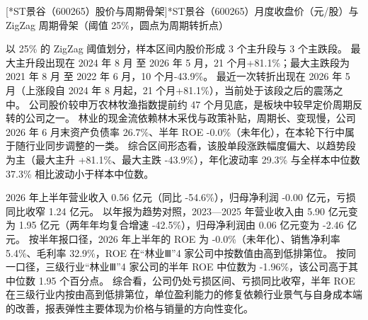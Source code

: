 \begin{center}
\begin{minipage}{\textwidth}\centering
{}

[*ST景谷（600265）股价与周期骨架]{*ST景谷（600265）月度收盘价（元/股）与 ZigZag 周期骨架（阈值 25\%，圆点为周期转折点）}
\end{minipage}
\end{center}

 以 25\% 的 ZigZag 阈值划分，样本区间内股价形成 3 个主升段与 3 个主跌段。 最大主升段出现在 2024 年 8 月 至 2026 年 5 月，21 个月+81.1\%；最大主跌段为 2021 年 8 月 至 2022 年 6 月，10 个月-43.9\%。 最近一次转折出现在 2026 年 5 月（上涨段自 2024 年 8 月起，21 个月+81.1\%），当前处于该段之后的震荡之中。 公司股价较申万农林牧渔指数提前约 47 个月见底，是板块中较早定价周期反转的公司之一。 林业的现金流依赖林木采伐与政策补贴，周期长、变现慢，公司 2026 年 6 月末资产负债率 26.7\%、半年 ROE -0.0\%（未年化），在本轮下行中属于随行业同步调整的一类。 综合区间形态看，该股单段涨跌幅度偏大、以趋势段为主（最大主升 +81.1\%、最大主跌 -43.9\%），年化波动率 29.3\% 与全样本中位数 37.3\% 相比波动小于样本中位数。

 2026 年上半年营业收入 0.56 亿元（同比 -54.6\%），归母净利润 -0.00 亿元，亏损同比收窄 1.24 亿元。 以年报为趋势对照，2023---2025 年营业收入由 5.90 亿元变为 1.95 亿元（两年年均复合增速 -42.5\%），归母净利润由 0.06 亿元变为 -2.46 亿元。 按半年报口径，2026 年上半年的 ROE 为 -0.0\%（未年化）、销售净利率 5.4\%、毛利率 32.9\%，ROE 在“林业Ⅲ”4 家公司中按数值由高到低排第位。 按同一口径，三级行业“林业Ⅲ”4 家公司的半年 ROE 中位数为 -1.96\%，该公司高于其中位数 1.95 个百分点。 综合看，公司仍处亏损区间、亏损同比收窄，半年 ROE 在三级行业内按由高到低排第位，单位盈利能力的修复依赖行业景气与自身成本端的改善，报表弹性主要体现为价格与销量的方向性变化。

